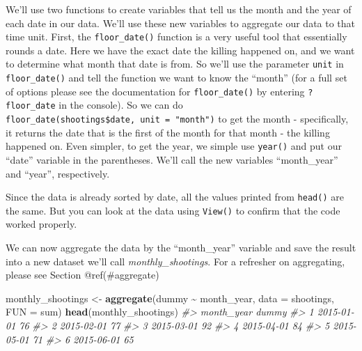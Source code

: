 \documentclass[
  12pt,
]{book}
\newenvironment{Shaded}{\begin{snugshade}}{\end{snugshade}}
\newcommand{\CommentTok}[1]{\textcolor[rgb]{0.56,0.35,0.01}{\textit{#1}}}
\newcommand{\DataTypeTok}[1]{\textcolor[rgb]{0.13,0.29,0.53}{#1}}
\newcommand{\KeywordTok}[1]{\textcolor[rgb]{0.13,0.29,0.53}{\textbf{#1}}}
\newcommand{\NormalTok}[1]{#1}
\newcommand{\OperatorTok}[1]{\textcolor[rgb]{0.81,0.36,0.00}{\textbf{#1}}}
\newcommand{\StringTok}[1]{\textcolor[rgb]{0.31,0.60,0.02}{#1}}
\begin{document}
We'll use two functions to create variables that tell us the month and the year of each date in our data. We'll use these new variables to aggregate our data to that time unit. First, the \texttt{floor\_date()} function is a very useful tool that essentially rounds a date. Here we have the exact date the killing happened on, and we want to determine what month that date is from. So we'll use the parameter \texttt{unit} in \texttt{floor\_date()} and tell the function we want to know the ``month'' (for a full set of options please see the documentation for \texttt{floor\_date()} by entering \texttt{?floor\_date} in the console). So we can do \texttt{floor\_date(shootings\$date,\ unit\ =\ "month")} to get the month - specifically, it returns the date that is the first of the month for that month - the killing happened on. Even simpler, to get the year, we simple use \texttt{year()} and put our ``date'' variable in the parentheses. We'll call the new variables ``month\_year'' and ``year'', respectively.

\begin{Shaded}
\end{Shaded}

Since the data is already sorted by date, all the values printed from \texttt{head()} are the same. But you can look at the data using \texttt{View()} to confirm that the code worked properly.

We can now aggregate the data by the ``month\_year'' variable and save the result into a new dataset we'll call \emph{monthly\_shootings}. For a refresher on aggregating, please see Section @ref(\#aggregate)

\begin{Shaded}
\begin{Highlighting}[]
\NormalTok{monthly\_shootings <{-}}\StringTok{ }\KeywordTok{aggregate}\NormalTok{(dummy }\OperatorTok{\textasciitilde{}}\StringTok{ }\NormalTok{month\_year, }\DataTypeTok{data =}\NormalTok{ shootings, }\DataTypeTok{FUN =}\NormalTok{ sum)}
\KeywordTok{head}\NormalTok{(monthly\_shootings)}
\CommentTok{\#>   month\_year dummy}
\CommentTok{\#> 1 2015{-}01{-}01    76}
\CommentTok{\#> 2 2015{-}02{-}01    77}
\CommentTok{\#> 3 2015{-}03{-}01    92}
\CommentTok{\#> 4 2015{-}04{-}01    84}
\CommentTok{\#> 5 2015{-}05{-}01    71}
\CommentTok{\#> 6 2015{-}06{-}01    65}
\end{Highlighting}
\end{Shaded}
\end{document}
